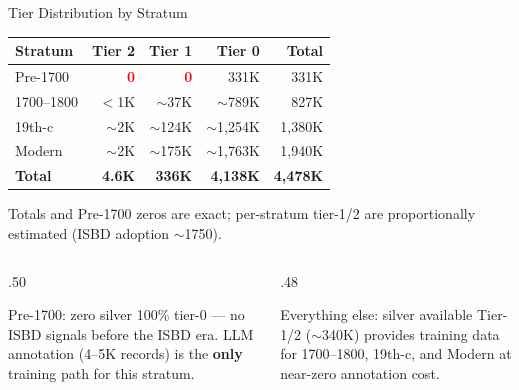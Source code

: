 \documentclass[xcolor,aspectratio=169,compress]{beamer}
\begin{document}
\begin{frame}{Tier Distribution by Stratum}
  \small
  \begin{tabular}{lrrrr}
    \toprule
    Stratum & Tier 2 & Tier 1 & Tier 0 & Total \\
    \midrule
    Pre-1700   & \textcolor{red}{\textbf{0}}   & \textcolor{red}{\textbf{0}} & 331K         & 331K   \\
    1700--1800 & $<$1K                          & $\sim$37K                   & $\sim$789K   & 827K   \\
    19th-c     & $\sim$2K                       & $\sim$124K                  & $\sim$1,254K & 1,380K \\
    Modern     & $\sim$2K                       & $\sim$175K                  & $\sim$1,763K & 1,940K \\
    \midrule
    \textbf{Total} & \textbf{4.6K} & \textbf{336K} & \textbf{4,138K} & \textbf{4,478K} \\
    \bottomrule
  \end{tabular}
  \par\vspace{2pt}
  \footnotesize Totals and Pre-1700 zeros are exact;
  per-stratum tier-1/2 are proportionally estimated (ISBD adoption $\sim$1750).
  \smallskip

  \begin{columns}[t]
    \begin{column}{.50\textwidth}
      \begin{alertblock}{Pre-1700: zero silver}
        100\% tier-0 --- no ISBD signals before the ISBD era.
        LLM annotation (4--5K records) is the \textbf{only} training path for this stratum.
      \end{alertblock}
    \end{column}
    \begin{column}{.48\textwidth}
      \begin{block}{Everything else: silver available}
        Tier-1/2 ($\sim$340K) provides training data for 1700--1800,
        19th-c, and Modern at near-zero annotation cost.
      \end{block}
    \end{column}
  \end{columns}
\end{frame}
\end{document}
